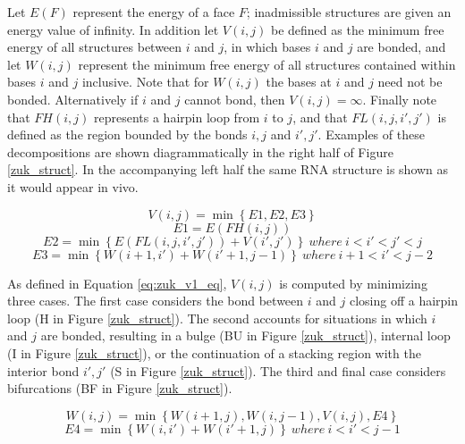 \documentclass[12pt, a4paper]{article}
\begin{document}
Let $E(F)$ represent the energy of a face $F$; inadmissible structures are given an energy value of infinity. In addition let $V(i, j)$ be defined as the minimum free energy of all structures between $i$ and $j$, in which bases $i$ and $j$ are bonded, and let $W(i, j)$ represent the minimum free energy of all structures contained within bases $i$ and $j$ inclusive.
Note that for $W(i, j)$ the bases at $i$ and $j$ need not be bonded. Alternatively if $i$ and $j$ cannot bond, then $V(i, j) = \infty $. Finally note that $FH(i, j)$ represents a
hairpin loop from $i$ to $j$, and that $FL(i, j, i' , j' )$ is defined as the region
bounded by the bonds $i, j$ and $i', j'$. Examples of these decompositions are shown
diagrammatically in the right half of Figure \ref{zuk_struct}. In the accompanying left
half the same RNA structure is shown as it would appear in vivo.

\begin{equation} \label{eq:zuk_v1_eq}
V(i, j) = \min \left\lbrace E1, E2, E3 \right\rbrace
\end{equation}
$$E1 = E(FH(i, j))$$
$$E2 = \min \left\lbrace E(FL(i, j, i', j')) + V (i', j') \right\rbrace \: where \: i < i' < j' < j$$
$$E3 = \min \left\lbrace W (i + 1, i') + W (i' + 1, j - 1) \right\rbrace \: where \: i + 1 < i' < j - 2$$


As defined in Equation \ref{eq:zuk_v1_eq}, $V(i, j)$ is computed by minimizing
three cases. The first case considers the bond between $i$ and $j$ closing off a hairpin
loop (H in Figure \ref{zuk_struct}). The second accounts for situations in which $i$ and $j$ are bonded, resulting in a bulge (BU in Figure \ref{zuk_struct}), internal loop (I in Figure \ref{zuk_struct}), or the continuation of a stacking region with the
interior bond $i',j'$ (S in Figure \ref{zuk_struct}). The third and final case considers bifurcations
(BF in Figure \ref{zuk_struct}).

\begin{equation} \label{eq:zuk_v1_eq2}
W (i, j) = \min \left\lbrace W(i + 1, j), W(i, j - 1), V(i, j), E4 \right\rbrace
\end{equation}
$$
E4 = \min \left\lbrace W (i, i') + W (i' + 1, j) \right\rbrace \: where \: i < i' < j - 1
$$
\end{document}
